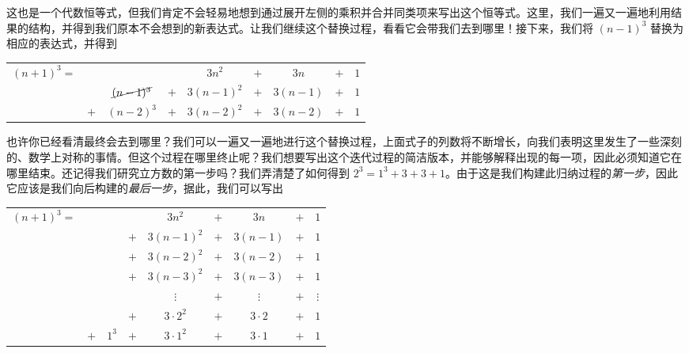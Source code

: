 这也是一个代数恒等式，但我们肯定不会轻易地想到通过展开左侧的乘积并合并同类项来写出这个恒等式。这里，我们一遍又一遍地利用结果的结构，并得到我们原本不会想到的新表达式。让我们继续这个替换过程，看看它会带我们去到哪里！接下来，我们将 $(n - 1)^3$ 替换为相应的表达式，并得到

\begin{center}
    \begin{tabular}{rcccccccc}
        $(n+1)^3=$ &     &                    &     &   $3n^2$   & $+$ &   $3n$   & $+$ & $1$\\
                   &     & $\cancel{(n-1)^3}$ & $+$ & $3(n-1)^2$ & $+$ & $3(n-1)$ & $+$ & $1$\\
                   & $+$ & $(n-2)^3$          & $+$ & $3(n-2)^2$ & $+$ & $3(n-2)$ & $+$ & $1$\\
    \end{tabular}
\end{center}

也许你已经看清最终会去到哪里？我们可以一遍又一遍地进行这个替换过程，上面式子的列数将不断增长，向我们表明这里发生了一些深刻的、数学上对称的事情。但这个过程在哪里终止呢？我们想要写出这个迭代过程的简洁版本，并能够解释出现的每一项，因此必须知道它在哪里结束。还记得我们研究立方数的第一步吗？我们弄清楚了如何得到 $2^3 = 1^3 + 3 + 3 + 1$。由于这是我们构建此归纳过程的\emph{第一步}，因此它应该是我们向后构建的\emph{最后一步}，据此，我们可以写出

\begin{center}
    \begin{tabular}{rcccccccc}
        $(n+1)^3=$ &     &       &     &   $3n^2$   & $+$ &   $3n$   & $+$ & $1$\\
                   &     &       & $+$ & $3(n-1)^2$ & $+$ & $3(n-1)$ & $+$ & $1$\\
                   &     &       & $+$ & $3(n-2)^2$ & $+$ & $3(n-2)$ & $+$ & $1$\\
                   &     &       & $+$ & $3(n-3)^2$ & $+$ & $3(n-3)$ & $+$ & $1$\\
                   &     &       &     & $\vdots$   & $+$ & $\vdots$ & $+$ & $\vdots$\\
                   &     &       & $+$ & $3 \cdot 2^2$ & $+$ & $3 \cdot 2$ & $+$ & $1$\\
                   & $+$ & $1^3$ & $+$ & $3 \cdot 1^2$ & $+$ & $3 \cdot 1$ & $+$ & $1$\\
    \end{tabular}
\end{center}

